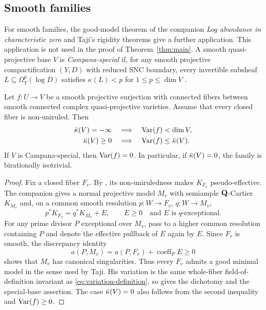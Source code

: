 \subsection{Smooth families}

For smooth families, the good-model theorem of the companion
\emph{Log abundance in characteristic zero} and Taji's rigidity
theorems give a further application. This application is not used in
the proof of Theorem~\ref{thm:main}. A smooth quasi-projective base $V$ is
\emph{Campana-special} if, for any smooth projective compactification
$(Y,D)$ with reduced SNC boundary, every invertible subsheaf
$L\subseteq\Omega_Y^p(\log D)$ satisfies $\kappa(L)<p$ for
$1\leq p\leq\dim V$ \cite[\S1]{TajiGoodModels}.

\begin{corollary}
\label{cor:nonuniruled-rigidity}
Let $f:U\to V$ be a smooth projective surjection with connected fibers
between smooth connected complex quasi-projective varieties. Assume
that every closed fiber is non-uniruled. Then
\[
\begin{aligned}
 \bar\kappa(V)=-\infty&\quad\Longrightarrow\quad \operatorname{Var}(f)<\dim V,\\
 \bar\kappa(V)\geq0&\quad\Longrightarrow\quad \operatorname{Var}(f)\leq\bar\kappa(V).
\end{aligned}
\]
If $V$ is Campana-special, then $\operatorname{Var}(f)=0$. In particular, if
$\bar\kappa(V)=0$, the family is birationally isotrivial.
\end{corollary}

\begin{proof}
Fix a closed fiber $F_v$. By \cite[Corollary~0.3]{BDPP}, its
non-uniruledness makes $K_{F_v}$ pseudo-effective. The companion
\cite[Corollary~11.2]{LogAbundanceCompanion} gives a normal projective
model $M_v$ with semiample $\mathbf Q$-Cartier $K_{M_v}$ and, on a common
smooth resolution $p:W\to F_v$, $q:W\to M_v$,
\[
 p^*K_{F_v}=q^*K_{M_v}+E,\qquad E\geq0
 \quad\text{and $E$ is $q$-exceptional}.
\]
For any prime divisor $P$ exceptional over $M_v$, pass to a higher
common resolution containing $P$ and denote the effective pullback
of $E$ again by $E$. Since $F_v$ is smooth, the discrepancy identity
\[
 a(P,M_v)=a(P,F_v)+\operatorname{coeff}_P E\geq0
\]
shows that $M_v$ has canonical singularities. Thus every $F_v$ admits
a good minimal model in the sense used by Taji. His variation is the
same whole-fiber field-of-definition invariant as
\eqref{eq:variation-definition}, so
\cite[Theorems~1.1--1.2]{TajiGoodModels} gives the dichotomy and the
special-base assertion. The case $\bar\kappa(V)=0$ also follows from the
second inequality and $\operatorname{Var}(f)\geq0$.
\end{proof}

